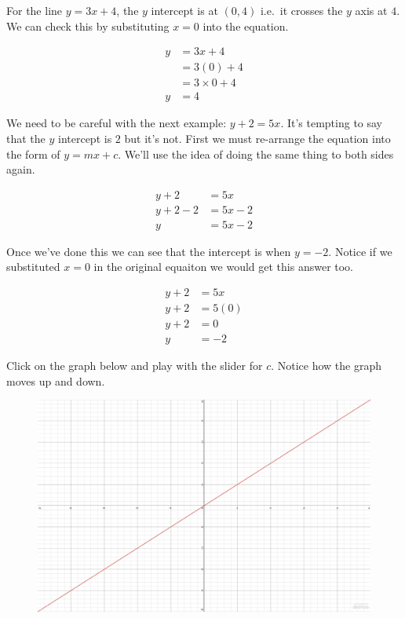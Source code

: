 \documentclass[
  a4paper,
]{scrbook}
\begin{document}
For the line \(y = 3x +4\), the \(y\) intercept is at \((0,4)\) i.e.~it
crosses the \(y\) axis at \(4\). We can check this by substituting
\(x=0\) into the equation.

\[
\begin{aligned}
y &= 3x +4 \\
  &= 3(0) +4 \\
  &= 3\times0 +4 \\
y &= 4
\end{aligned}
\]

We need to be careful with the next example: \(y + 2 = 5x\). It's
tempting to say that the \(y\) intercept is \(2\) but it's not. First we
must re-arrange the equation into the form of \(y=mx+c\). We'll use the
idea of doing the same thing to both sides again.

\[
\begin{aligned}
y +2 &= 5x \\
 y+2-2 &= 5x-2 \\
 y &= 5x-2
\end{aligned}
\]

Once we've done this we can see that the intercept is when \(y=-2\).
Notice if we substituted \(x=0\) in the original equaiton we would get
this answer too.

\[
\begin{aligned}
y +2 &= 5x \\
 y+2 &= 5(0) \\
 y +2 &= 0 \\
 y &= -2
\end{aligned}
\]

Click on the graph below and play with the slider for \(c\). Notice how
the graph moves up and down.

\begin{figure}

{\centering 

\href{https://www.desmos.com/calculator/llcrsdgmvo?embed}{\includegraphics{./06-straight_line_graphs_files/figure-pdf/unnamed-chunk-4-1.png}}

}

\end{figure}
\end{document}
